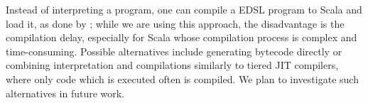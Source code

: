 Instead of interpreting a program, one can compile a EDSL program to Scala and load it, as done by \citet{Rompf11BBlocks};
while we are using this approach, the disadvantage is the compilation delay,
especially for Scala whose compilation process is complex and time-consuming.
Possible alternatives include generating bytecode directly or combining
interpretation and compilations similarly to tiered JIT compilers, where only
code which is executed often is compiled. We plan to investigate such
alternatives in future work.


%
%
%
%


